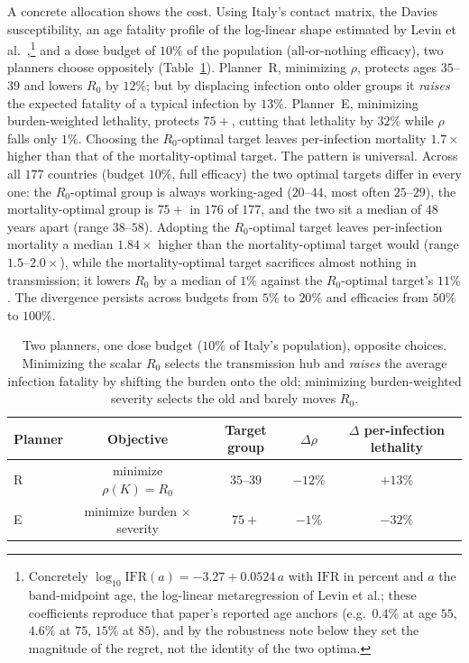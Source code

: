 \documentclass[12pt]{article}
\begin{document}
A concrete allocation shows the cost. Using Italy's contact matrix, the Davies susceptibility, an age fatality profile of the log-linear shape estimated by Levin et al.\ \cite{levin2020},\footnote{Concretely $\log_{10}\mathrm{IFR}(a)=-3.27+0.0524\,a$ with $\mathrm{IFR}$ in percent and $a$ the band-midpoint age, the log-linear metaregression of Levin et al.; these coefficients reproduce that paper's reported age anchors (e.g.\ $0.4\%$ at age $55$, $4.6\%$ at $75$, $15\%$ at $85$), and by the robustness note below they set the magnitude of the regret, not the identity of the two optima.} and a dose budget of $10\%$ of the population (all-or-nothing efficacy), two planners choose oppositely (Table~\ref{tab:alloc}). Planner~R, minimizing $\rho$, protects ages $35$--$39$ and lowers $R_0$ by $12\%$; but by displacing infection onto older groups it \emph{raises} the expected fatality of a typical infection by $13\%$. Planner~E, minimizing burden-weighted lethality, protects $75+$, cutting that lethality by $32\%$ while $\rho$ falls only $1\%$. Choosing the $R_0$-optimal target leaves per-infection mortality $1.7\times$ higher than that of the mortality-optimal target. The pattern is universal. Across all $177$ countries (budget $10\%$, full efficacy) the two optimal targets differ in every one: the $R_0$-optimal group is always working-aged ($20$--$44$, most often $25$--$29$), the mortality-optimal group is $75+$ in $176$ of $177$, and the two sit a median of $48$ years apart (range $38$--$58$). Adopting the $R_0$-optimal target leaves per-infection mortality a median $1.84\times$ higher than the mortality-optimal target would (range $1.5$--$2.0\times$), while the mortality-optimal target sacrifices almost nothing in transmission; it lowers $R_0$ by a median of $1\%$ against the $R_0$-optimal target's $11\%$. The divergence persists across budgets from $5\%$ to $20\%$ and efficacies from $50\%$ to $100\%$.

\begin{table}[h]
\centering
\small
\begin{tabular}{lcccc}
\toprule
Planner & Objective & Target group & $\Delta\rho$ & $\Delta$ per-infection lethality \\
\midrule
R & minimize $\rho(K)=R_0$ & $35$--$39$ & $-12\%$ & $+13\%$ \\
E & minimize burden $\times$ severity & $75+$ & $-1\%$ & $-32\%$ \\
\bottomrule
\end{tabular}
\caption{Two planners, one dose budget ($10\%$ of Italy's population), opposite choices. Minimizing the scalar $R_0$ selects the transmission hub and \emph{raises} the average infection fatality by shifting the burden onto the old; minimizing burden-weighted severity selects the old and barely moves $R_0$.}
\label{tab:alloc}
\end{table}
\end{document}
